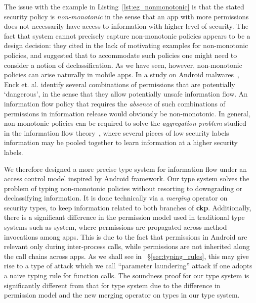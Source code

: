 The issue with the example in Listing~\ref{lst:eg_nonmonotonic} is that the stated security policy is \emph{non-monotonic} in the sense that an app with more permissions does not necessarily have access to information with higher
level of security.  The fact that {\BN} system
cannot precisely capture non-monotonic policies appears to be a design decision:
they cited in \cite{Banerjee:2005ht} the lack of motivating examples for non-monotonic policies, and
suggested that to accommodate such policies one might need to consider a notion of declassification.
As we have seen, however, non-monotonic policies can arise naturally in mobile
apps. In a study on Android
malwares~\cite{Enck:2009:UAS:1512148.1512324}, Enck et. al. 
identify several combinations of permissions that are potentially
`dangerous', in the sense that they allow potentially unsafe information flow.
An information flow policy that requires
the {\em absence} of such combinations of permissions in 
information release would obviously be non-monotonic.
In general, non-monotonic policies can be required to solve the {\em aggregation problem}
studied in the information flow theory~\cite{Landauer93}, where several pieces of low security labels information may
be pooled together to learn information at a higher security labels.

We therefore designed a more precise type system for information flow
under an access control model inspired by Android framework.
Our type system solves the problem of typing non-monotonic policies
without resorting to downgrading or declassifying information.
It is done technically via a \emph{merging} operator on security types, to keep information related to both
branches of \textbf{ckp}. Additionally, there is a significant
difference in the permission model used in traditional type systems such as {\BN} system, where permissions
are propagated across method invocations among apps. This is due to the fact that permissions in Android are relevant only during inter-process calls, while permissions are not inherited along the call
chains across apps. As we shall see in ~\S\ref{sec:typing_rules}, this may give rise to a type of attack which we call
``parameter laundering'' attack if one adopts a naive typing rule for function calls.
The soundness proof for our type system is significantly different from that for {\BN} type system due to the difference
in permission model and the new merging operator on types in our type system.

